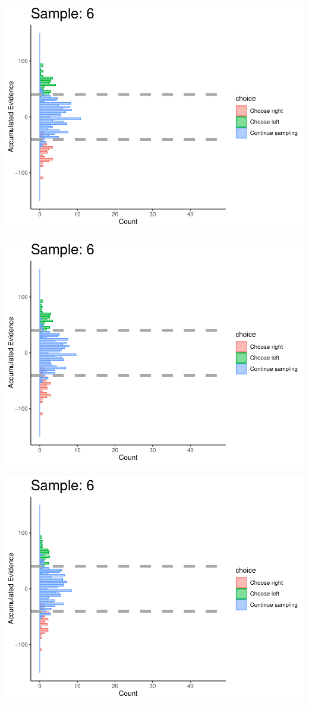 \documentclass[
]{book}
\begin{document}
\begin{center}\includegraphics[width=0.8\linewidth]{LateNightBayes_files/figure-latex/collapsing_check-56} \end{center}

\begin{center}\includegraphics[width=0.8\linewidth]{LateNightBayes_files/figure-latex/collapsing_check-57} \end{center}

\begin{center}\includegraphics[width=0.8\linewidth]{LateNightBayes_files/figure-latex/collapsing_check-58} \end{center}
\end{document}
